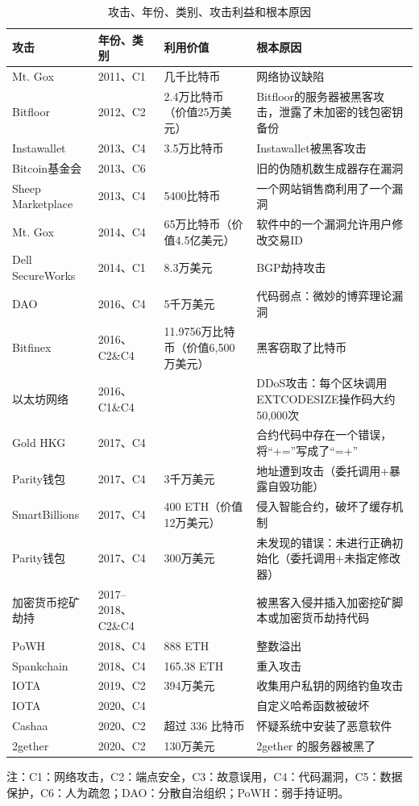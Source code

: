 \begin{translation}
\begin{longtable}[htbp] {|p{2cm}|p{2cm}|p{3.5cm}|p{4.5cm}|} 
    \caption{攻击、年份、类别、攻击利益和根本原因} 
    \label{tab:攻击、年份、类别、攻击利益和根本原因} \\
    \hline 攻击 & 年份、类别 & 利用价值 & 根本原因 \\
    \hline Mt. Gox & 2011、C1 & 几千比特币 & 网络协议缺陷\\
    \hline Bitfloor & 2012、C2 & 2.4万比特币（价值25万美元） & Bitfloor的服务器被黑客攻击，泄露了未加密的钱包密钥备份 \\
    \hline Instawallet & 2013、C4 & 3.5万比特币 & Instawallet被黑客攻击 \\
    \hline Bitcoin基金会 & 2013、C6 &  & 旧的伪随机数生成器存在漏洞 \\
    \hline Sheep Marketplace & 2013、C4 & 5400比特币 & 一个网站销售商利用了一个漏洞 \\
    \hline Mt. Gox & 2014、C4 & 65万比特币（价值4.5亿美元） & 软件中的一个漏洞允许用户修改交易ID \\
    \hline Dell SecureWorks & 2014、C1 & 8.3万美元 & BGP劫持攻击 \\
    \hline DAO & 2016、C4 & 5千万美元 & 代码弱点：微妙的博弈理论漏洞 \\
    \hline Bitfinex & 2016、C2\&C4 & 11.9756万比特币（价值6,500万美元） & 黑客窃取了比特币 \\
    \hline 以太坊网络 & 2016、C1\&C4 &  & DDoS攻击：每个区块调用EXTCODESIZE操作码大约50,000次 \\
    \hline Gold HKG & 2017、C4 &  & 合约代码中存在一个错误，将“+=”写成了“=+” \\
    \hline Parity钱包 & 2017、C4 & 3千万美元 & 地址遭到攻击（委托调用+暴露自毁功能） \\
    \hline SmartBillions & 2017、C4 & 400 ETH（价值12万美元） & 侵入智能合约，破坏了缓存机制 \\
    \hline Parity钱包 & 2017、C4 & 300万美元 & 未发现的错误：未进行正确初始化（委托调用+未指定修改器） \\
    \hline 加密货币挖矿劫持 & 2017–2018、C2\&C4 &  & 被黑客入侵并插入加密挖矿脚本或加密货币劫持代码 \\
    \hline PoWH & 2018、C4 & 888 ETH & 整数溢出 \\
    \hline Spankchain & 2018、C4 & 165.38 ETH & 重入攻击 \\
    \hline IOTA & 2019、C2 & 394万美元 & 收集用户私钥的网络钓鱼攻击 \\
    \hline IOTA & 2020、C4 &  & 自定义哈希函数被破坏 \\
    \hline Cashaa & 2020、C2 & 超过 336 比特币 & 怀疑系统中安装了恶意软件 \\
    \hline 2gether & 2020、C2 & 130万美元 & 2gether 的服务器被黑了 \\
    \hline
\end{longtable}
注：C1：网络攻击，C2：端点安全，C3：故意误用，C4：代码漏洞，C5：数据保护，C6：人为疏忽；DAO：分散自治组织；PoWH：弱手持证明。


\end{translation}
